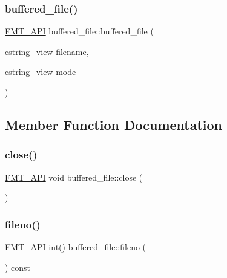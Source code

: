 \subsubsection{\texorpdfstring{buffered\+\_\+file()}{buffered\_file()}\hspace{0.1cm}{\footnotesize\ttfamily [3/3]}}
{\footnotesize\ttfamily \hyperlink{core_8h_a9a4960b70582ed2620911a0b75dce0b5}{F\+M\+T\+\_\+\+A\+PI} buffered\+\_\+file\+::buffered\+\_\+file (\begin{DoxyParamCaption}\item[{\hyperlink{posix_8h_ae8eb4eb4ba15f0c8755e1d5c8e7c07d9}{cstring\+\_\+view}}]{filename,  }\item[{\hyperlink{posix_8h_ae8eb4eb4ba15f0c8755e1d5c8e7c07d9}{cstring\+\_\+view}}]{mode }\end{DoxyParamCaption})}



\subsection{Member Function Documentation}
\mbox{\label{classbuffered__file_a2756c39b06594666c5a8712873d7c878}} 
\subsubsection{\texorpdfstring{close()}{close()}}
{\footnotesize\ttfamily \hyperlink{core_8h_a9a4960b70582ed2620911a0b75dce0b5}{F\+M\+T\+\_\+\+A\+PI} void buffered\+\_\+file\+::close (\begin{DoxyParamCaption}{ }\end{DoxyParamCaption})}

\mbox{\label{classbuffered__file_ab86229c986f9598cf523ce2a026b750c}} 
\subsubsection{\texorpdfstring{fileno()}{fileno()}}
{\footnotesize\ttfamily \hyperlink{core_8h_a9a4960b70582ed2620911a0b75dce0b5}{F\+M\+T\+\_\+\+A\+PI} int() buffered\+\_\+file\+::fileno (\begin{DoxyParamCaption}{ }\end{DoxyParamCaption}) const}

